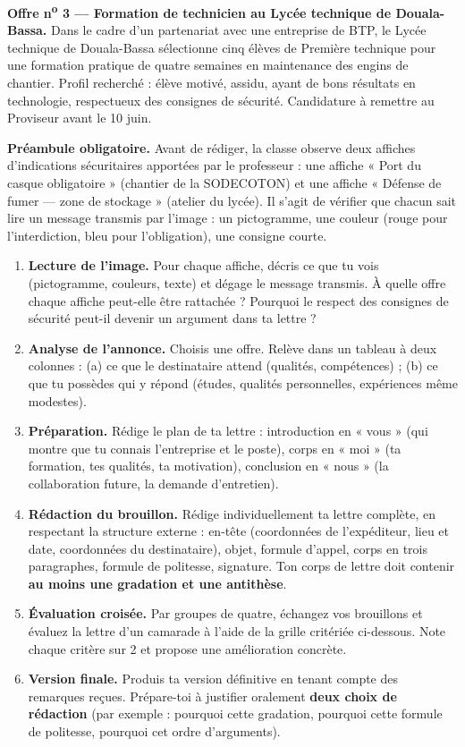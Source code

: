 \documentclass[11pt]{article}
\newcounter{popsec}
\newcounter{popsub}
\newcommand{\courssub}[1]{%
  \stepcounter{popsub}%
  \par\vspace{9pt}\noindent{\popxbold\fontsize{11.5}{13}\selectfont\color{popink}{\color{poporange}\thepopsec.\thepopsub}\hspace{6pt}#1}\par\nopagebreak\vspace{4pt}
}
\begin{document}
\textbf{Offre n\textsuperscript{o} 3 --- Formation de technicien au Lycée technique de Douala-Bassa.} Dans le cadre d'un partenariat avec une entreprise de BTP, le Lycée technique de Douala-Bassa sélectionne cinq élèves de Première technique pour une formation pratique de quatre semaines en maintenance des engins de chantier. Profil recherché : élève motivé, assidu, ayant de bons résultats en technologie, respectueux des consignes de sécurité. Candidature à remettre au Proviseur avant le 10 juin.

\textbf{Préambule obligatoire.} Avant de rédiger, la classe observe deux affiches d'indications sécuritaires apportées par le professeur : une affiche « Port du casque obligatoire » (chantier de la SODECOTON) et une affiche « Défense de fumer --- zone de stockage » (atelier du lycée). Il s'agit de vérifier que chacun sait lire un message transmis par l'image : un pictogramme, une couleur (rouge pour l'interdiction, bleu pour l'obligation), une consigne courte.

\courssub{Consignes}

\begin{enumerate}
\item \textbf{Lecture de l'image.} Pour chaque affiche, décris ce que tu vois (pictogramme, couleurs, texte) et dégage le message transmis. À quelle offre chaque affiche peut-elle être rattachée ? Pourquoi le respect des consignes de sécurité peut-il devenir un argument dans ta lettre ?
\item \textbf{Analyse de l'annonce.} Choisis une offre. Relève dans un tableau à deux colonnes : (a) ce que le destinataire attend (qualités, compétences) ; (b) ce que tu possèdes qui y répond (études, qualités personnelles, expériences même modestes).
\item \textbf{Préparation.} Rédige le plan de ta lettre : introduction en « vous » (qui montre que tu connais l'entreprise et le poste), corps en « moi » (ta formation, tes qualités, ta motivation), conclusion en « nous » (la collaboration future, la demande d'entretien).
\item \textbf{Rédaction du brouillon.} Rédige individuellement ta lettre complète, en respectant la structure externe : en-tête (coordonnées de l'expéditeur, lieu et date, coordonnées du destinataire), objet, formule d'appel, corps en trois paragraphes, formule de politesse, signature. Ton corps de lettre doit contenir \textbf{au moins une gradation et une antithèse}.
\item \textbf{Évaluation croisée.} Par groupes de quatre, échangez vos brouillons et évaluez la lettre d'un camarade à l'aide de la grille critériée ci-dessous. Note chaque critère sur 2 et propose une amélioration concrète.
\item \textbf{Version finale.} Produis ta version définitive en tenant compte des remarques reçues. Prépare-toi à justifier oralement \textbf{deux choix de rédaction} (par exemple : pourquoi cette gradation, pourquoi cette formule de politesse, pourquoi cet ordre d'arguments).
\end{enumerate}
\end{document}
